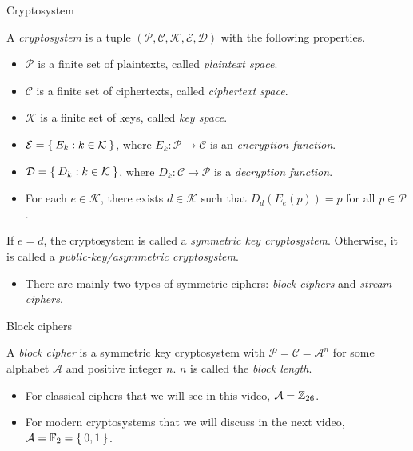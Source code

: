 \begin{frame}{Cryptosystem}
\begin{definition}
A \textit{cryptosystem} is a tuple $(\mathcal{P},\mathcal{C},\mathcal{K},\mathcal{E},\mathcal{D})$ with the following properties.
\begin{itemize}
        \item $\mathcal{P}$ is a finite set of plaintexts, called \textit{plaintext space}.
        \item $\mathcal{C}$ is a finite set of ciphertexts, called \textit{ciphertext space}.
        \item $\mathcal{K}$ is a finite set of keys, called \textit{key space}.
        \item $\mathcal{E}=\Set{E_k:k\in\mathcal{K}}$, where $E_k:\mathcal{P}\to\mathcal{C}$ is an \textit{encryption function}.
        \item $\mathcal{D}=\Set{D_k:k\in\mathcal{K}}$, where $D_k:\mathcal{C}\to\mathcal{P}$ is a \textit{decryption function}.
        \item For each $e\in\mathcal{K}$, there exists $d\in\mathcal{K}$ such that $D_d(E_e(p))=p$ for all $p\in\mathcal{P}$.
\end{itemize}
If $e=d$, the cryptosystem is called a \textit{symmetric key cryptosystem}.
Otherwise, it is called a \textit{public-key/asymmetric cryptosystem}.
\end{definition}
\begin{itemize}
    \item There are mainly two types of symmetric ciphers: \textit{block ciphers} and \textit{stream ciphers}.
\end{itemize}
\end{frame}

\begin{frame}{Block ciphers}
\begin{definition}
A \textit{block cipher} is a symmetric key cryptosystem with $\mathcal{P}=\mathcal{C}=\mathcal{A}^n$ for some alphabet $\mathcal{A}$ and positive integer $n$.
$n$ is called the \textit{block length}.
\end{definition}
\begin{itemize}
    \item For classical ciphers that we will see in this video, $\mathcal{A}={\mathbb Z}_{26}$.
    \item For modern cryptosystems that we will discuss in the next video, $\mathcal{A}={\mathbb F}_2=\Set{0,1}$.
\end{itemize}
\end{frame}

